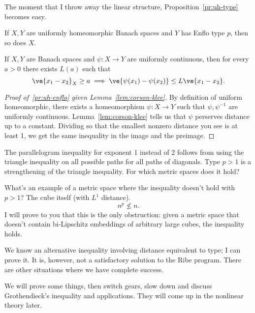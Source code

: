 
The moment that I throw away the linear structure, Proposition~\ref{pr:uh-type} becomes easy.
\begin{pr}
If $X,Y$ are uniformly homeomorphic Banach spaces and $Y$ has Enflo type $p$, then so does $X$.
\end{pr}

\begin{lem}
If $X,Y$ are Banach spaces and $\psi:X\to Y$ are uniformly continuous, then for every $a>0$ there exists $L(a)$ such that 
\[
\ve{x_1-x_2}_X\ge a \implies \ve{\psi(x_1)-\psi(x_2)}\le L\ve{x_1-x_2}.
\]
\end{lem}

\begin{proof}[Proof of~\ref{pr:uh-enflo} given Lemma~\ref{lem:corson-klee}]
By definition of uniform homeomorphic, there exists a homeomorphism $\psi:X\to Y$ such that $\psi,\psi^{-1}$ are uniformly continuous. Lemma~\ref{lem:corson-klee} tells us that $\psi$ perserves distance up to a constant. Dividing so that the smallest nonzero distance you see is at least 1, we get the same inequality in the image and the preimage.
\end{proof}

The parallelogram inequality for exponent 1 instead of 2 follows from using the triangle inequality on all possible paths for all paths of diagonals. Type $p>1$ is a strengthening of the triangle inequality. For which metric spaces does it hold?

What's an example of a metric space where the inequality doesn't hold with $p>1$? The cube itself (with $L^1$ distance).
\[
n^p\nleq n.
\]
I will prove to you that this is the only obstruction: given a metric space that doesn't contain bi-Lipschitz embeddings of arbitrary large cubes, the inequality holds. 

We know an alternative inequality involving distance equivalent to type; I can prove it. It is, however, not a satisfactory solution to the Ribe program. There are other situations where we have complete success.

We will prove some things, then switch gears, slow down and discuss Grothendieck's inequality and applications. They will come up in the nonlinear theory later.